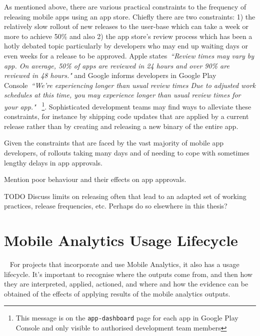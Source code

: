 As mentioned above, there are various practical constraints to the frequency of releasing mobile apps using an app store. Chiefly there are two constraints: 1) the relatively slow rollout of new releases to the user-base which can take a week or more to achieve 50\% and also 2) the app store's review process which has been a hotly debated topic particularly by developers who may end up waiting days or even weeks for a release to be approved. Apple states~\emph{``Review times may vary by app. On average, 50\% of apps are reviewed in 24 hours and over 90\% are reviewed in 48 hours."} and Google informs developers in Google Play Console~\emph{``We're experiencing longer than usual review times
Due to adjusted work schedules at this time, you may experience longer than usual review times for your app."} ~\footnote{This message is on the \texttt{app-dashboard} page for each app in Google Play Console and only visible to authorised development team members}. Sophisticated development teams may find ways to alleviate these constraints, for instance by shipping code updates that are applied by a current release rather than by creating and releasing a new binary of the entire app.

Given the constraints that are faced by the vast majority of mobile app developers, of rollouts taking many days and of needing to cope with sometimes lengthy delays in app approvals. 

Mention poor behaviour and their effects on app approvals.

TODO Discuss limits on releasing often that lead to an adapted set of working practices, release frequencies, etc. Perhaps do so elsewhere in this thesis?

\section{Mobile Analytics Usage Lifecycle}~\label{section-mobile-analytics-usage-lifecycle}
For projects that incorporate and use Mobile Analytics, it also has a usage lifecycle. It's important to recognise where the outputs come from, and then how they are interpreted, applied, actioned, and where and how the evidence can be obtained of the effects of applying results of the mobile analytics outputs.

